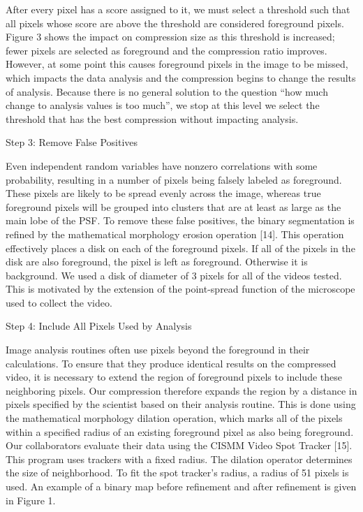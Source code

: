 After every pixel has a score assigned to it, we must select a threshold such that all pixels whose score are above the threshold are considered foreground pixels.  Figure 3 shows the impact on compression size as this threshold is increased; fewer pixels are selected as foreground and the compression ratio improves.  However, at some point this causes foreground pixels in the image to be missed, which impacts the data analysis and the compression begins to change the results of analysis.  Because there is no general solution to the question “how much change to analysis values is too much”, we stop at this level we select the threshold that has the best compression without impacting analysis.

Step 3: Remove False Positives

Even independent random variables have nonzero correlations with some probability, resulting in a number of pixels being falsely labeled as foreground.  These pixels are likely to be spread evenly across the image, whereas true foreground pixels will be grouped into clusters that are at least as large as the main lobe of the PSF.  To remove these false positives, the binary segmentation is refined by the mathematical morphology erosion operation [14].
This operation effectively places a disk on each of the foreground pixels.  If all of the pixels in the disk are also foreground, the pixel is left as foreground.  Otherwise it is background. We used a disk of diameter of 3 pixels for all of the videos tested.  This is motivated by the extension of the point-spread function of the microscope used to collect the video.

Step 4: Include All Pixels Used by Analysis

Image analysis routines often use pixels beyond the foreground in their calculations.  To ensure that they produce identical results on the compressed video, it is necessary to extend the region of foreground pixels to include these neighboring pixels.  Our compression therefore expands the region by a distance in pixels specified by the scientist based on their analysis routine.  This is done using the mathematical morphology dilation operation, which marks all of the pixels within a specified radius of an existing foreground pixel as also being foreground.
Our collaborators evaluate their data using the CISMM Video Spot Tracker [15].  This program uses trackers with a fixed radius.  The dilation operator determines the size of neighborhood.  To fit the spot tracker’s radius, a radius of 51 pixels is used.  An example of a binary map before refinement and after refinement is given in Figure 1.

